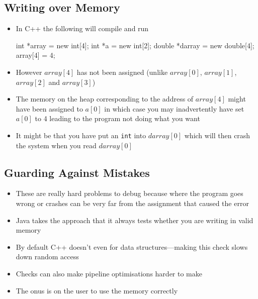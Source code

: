 
\begin{slide}
\section[-2]{Writing over Memory}

\begin{PauseHighLight}
  \begin{itemize}
  \item In C++ the following will compile and run
    \begin{cpp}
      int *array = new int[4];
      int *a = new int[2];
      double *darray = new double[4];
      array[4] = 4;
    \end{cpp}\pause
    \vspace*{-1cm}
  \item However \jl$array[4]$ has not been assigned (unlike
    \jl$array[0]$, \jl$array[1]$, \jl$array[2]$ and \jl$array[3]$)\pause
  \item The memory on the heap corresponding to the address of
    \jl$array[4]$ might have been assigned to \jl$a[0]$ in which case
    you may inadvertently have set \jl$a[0]$ to 4 leading to the
    program not doing what you want\pause
  \item It might be that you have put an \texttt{int} into
    \jl$darray[0]$ which will then crash the system when you read
    \jl$darray[0]$\pause
  \end{itemize}
\end{PauseHighLight}

\end{slide}


\begin{slide}
\section{Guarding Against Mistakes}

\begin{PauseHighLight}
  \begin{itemize}
  \item These are really hard problems to debug because where the
    program goes wrong or crashes can be very far from the assignment
    that caused the error\pause
  \item Java takes the approach that it always tests whether you are
    writing in valid memory\pause
  \item By default C++ doesn't even for data structures\pause---making
    this check slows down random access\pause
  \item Checks can also make pipeline optimisations harder to
    make\pause
  \item The onus is on the user to use the memory correctly\pause
   \end{itemize}
\end{PauseHighLight}

\end{slide}

